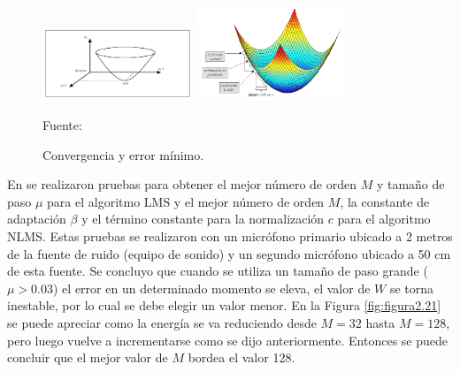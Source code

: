 \begin{enumerate}
\begin{enumerate}
\begin{figure}[ht]
\begin{center}
\includegraphics[width=0.4\textwidth]{Imagenes/Cap2/image020}
\includegraphics[width=0.4\textwidth]{Imagenes/Cap2/image021}
\end{center}
\begin{center}
\vskip -0.5cm
\caption{\small{Convergencia y error mínimo.}}
\label{fig:figura2.20}
{\small{Fuente: \cite{simon}}}
\end{center}
\end{figure}
\end{enumerate}
\vskip -0.5cm
En \citep{simon} se realizaron pruebas para obtener el mejor número de orden $M$ y tamaño de paso $\mu$ para el algoritmo LMS y el mejor número de orden $M$, la constante de adaptación $\beta$ y el término constante para la normalización $c$ para el algoritmo NLMS. Estas pruebas se realizaron con un micrófono primario ubicado a 2 metros de la fuente de ruido (equipo de sonido) y un segundo micrófono ubicado a 50 cm de esta fuente. Se concluyo que cuando se utiliza un tamaño de paso grande ($\mu > 0.03$) el error en un determinado momento se eleva, el valor de $W$ se torna inestable, por lo cual se debe elegir un valor menor. 
\vskip 0.5cm
En la Figura \ref{fig:figura2.21} se puede apreciar como la energía se va reduciendo desde $M=32$ hasta $M=128$, pero luego vuelve a incrementarse como se dijo anteriormente. Entonces se puede concluir que el mejor valor de $M$ bordea el valor 128.


\end{enumerate}
